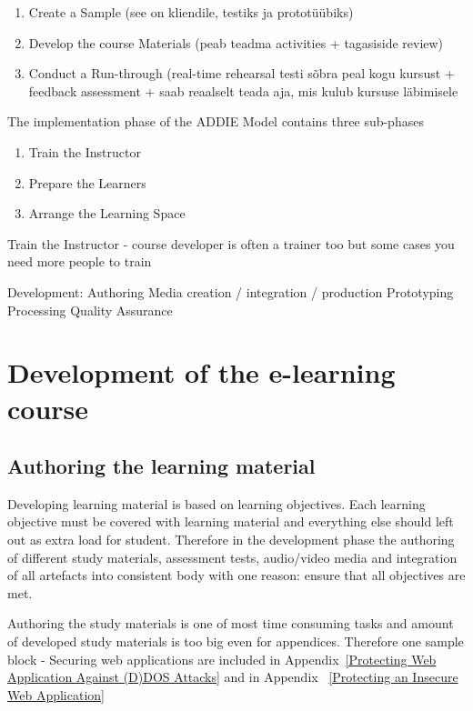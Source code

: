 \begin{enumerate}
\item Create a Sample (see on kliendile, testiks ja prototüübiks)
\item Develop the course Materials (peab teadma activities + tagasiside review)
\item Conduct a Run-through (real-time rehearsal testi sõbra peal kogu kursust +  feedback assessment + saab reaalselt teada aja, mis kulub kursuse läbimisele
\end{enumerate}


The implementation phase of the ADDIE Model contains three sub-phases

\begin{enumerate}
\item Train the Instructor
\item Prepare the Learners
\item Arrange the Learning Space
\end{enumerate}

Train the Instructor - course developer is often a trainer too but some cases you need more people to train


Development:
Authoring
Media creation / integration / production
Prototyping
Processing
Quality Assurance

\section{Development of the e-learning course}

\subsection{Authoring the learning material}
Developing learning material is based on learning objectives. Each learning objective must be covered with learning material and everything else should left out as extra load for student. Therefore in the development phase the authoring of different study materials, assessment tests, audio/video media and integration of all artefacts into consistent body with one reason: ensure that all objectives are met.

Authoring the study materials is one of most time consuming tasks and amount of developed study materials is too big even for appendices. Therefore one sample block - Securing web applications are included in Appendix~\ref{Protecting Web Application Against (D)DOS Attacks} and in Appendix~ \ref{Protecting an Insecure Web Application} 

